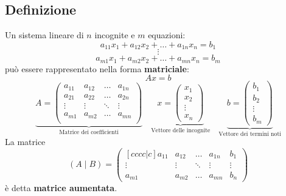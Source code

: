 \documentclass[a4paper]{article}
\theoremstyle{break}
\theoremstyle{break}
\theoremstyle{break}
\theoremstyle{break}
\begin{document}
\subsection{Definizione}
Un sistema lineare di \( n \) incognite e \( m \) equazioni:
\[
	a_{11}x_1 + a_{12}x_2 + \ldots + a_{1n}x_n = b_1
\]
\[
	\vdots
\]
\[
	a_{m1}x_1 + a_{m2}x_2 + \ldots + a_{mn}x_n = b_m
\]
può essere rappresentato nella forma \textbf{matriciale}:
\[
	Ax = b
\]
\[
	\underbrace{
		A = \begin{pmatrix}
			a_{11} & a_{12} & \ldots & a_{1n} \\
			a_{21} & a_{22} & \ldots & a_{2n} \\
			\vdots & \vdots & \ddots & \vdots \\
			a_{m1} & a_{m2} & \ldots & a_{mn} \\
		\end{pmatrix}}_{\text{Matrice dei coefficienti}} \quad \underbrace{x = \begin{pmatrix}
			x_1    \\
			x_2    \\
			\vdots \\
			x_n
		\end{pmatrix}}_{\text{Vettore delle incognite}} \quad \underbrace{b = \begin{pmatrix}
			b_1    \\
			b_2    \\
			\vdots \\
			b_m
		\end{pmatrix}}_{\text{Vettore dei termini noti}}
\]
La matrice \[ (A \;|\; B) = \begin{pmatrix}[cccc|c]
		a_{11} & a_{12} & \ldots & a_{1n} & b_1    \\
		\vdots & \vdots & \ddots & \vdots & \vdots \\
		a_{m1} & a_{m2} & \ldots & a_{mn} & b_n
	\end{pmatrix}  \] è detta \textbf{matrice aumentata}.
\end{document}
